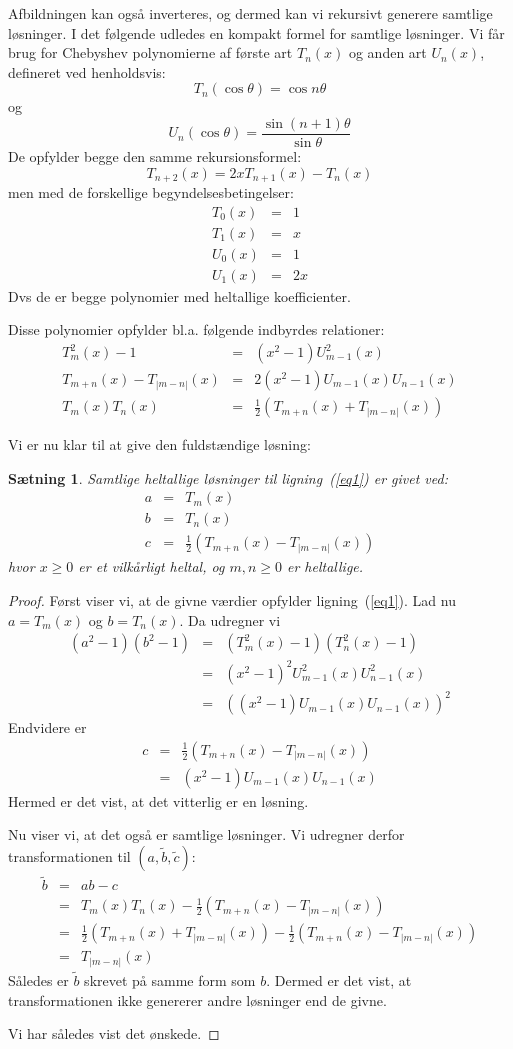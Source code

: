 \documentclass[12pt,oneside,a4paper]{article}
\newcommand{\bas}{\begin{eqnarray*}}
\newcommand{\eas}{\end{eqnarray*}}
\newtheorem{thm}{Sætning}[section]
\begin{document}
Afbildningen kan også inverteres, og dermed kan vi rekursivt generere samtlige
løsninger. I det følgende udledes en kompakt formel for samtlige løsninger. Vi
får brug for Chebyshev polynomierne af første art $T_n(x)$ og anden art
$U_n(x)$, defineret ved henholdsvis:
$$
T_n(\cos\theta) = \cos n\theta
$$
og
$$
U_n(\cos\theta) = \frac{\sin (n+1)\theta}{\sin\theta}
$$
De opfylder begge den samme rekursionsformel:
$$
T_{n+2}(x) = 2xT_{n+1}(x) - T_n(x)
$$
men med de forskellige begyndelsesbetingelser:
\bas
T_0(x) &=& 1 \\
T_1(x) &=& x \\
U_0(x) &=& 1 \\
U_1(x) &=& 2x
\eas
Dvs de er begge polynomier med heltallige koefficienter.

Disse polynomier opfylder bl.a. følgende indbyrdes relationer:
\bas
T_m^2(x) - 1 &=& (x^2-1)U_{m-1}^2(x) \\
T_{m+n}(x) - T_{|m-n|}(x) &=& 2(x^2-1)U_{m-1}(x)U_{n-1}(x) \\
T_m(x) T_n(x) &=& \frac12 \left(T_{m+n}(x) + T_{|m-n|}(x)\right)
\eas

Vi er nu klar til at give den fuldstændige løsning:
\begin{thm}
    Samtlige heltallige løsninger til ligning~(\ref{eq1}) er givet ved:
    \bas
    a &=& T_m(x) \\
    b &=& T_n(x) \\
    c &=& \frac 12 \left(T_{m+n}(x) - T_{|m-n|}(x)\right) 
    \eas
    hvor $x\ge 0$ er et vilkårligt heltal, og $m,n \ge 0$ er heltallige.
\end{thm}
\begin{proof}
    Først viser vi, at de givne værdier opfylder ligning~(\ref{eq1}). 
Lad nu $a=T_m(x)$ og $b = T_n(x)$. Da udregner vi 
\bas
(a^2-1)(b^2-1) &=& (T_m^2(x)-1)(T_n^2(x)-1) \\
                        &=& (x^2-1)^2 U_{m-1}^2(x) U_{n-1}^2(x) \\
                        &=& \left( (x^2-1) U_{m-1}(x) U_{n-1}(x)\right)^2
\eas
Endvidere er 
\bas
c &=& \frac 12 \left(T_{m+n}(x) - T_{|m-n|}(x)\right) \\
&=& (x^2-1) U_{m-1}(x) U_{n-1}(x) 
\eas
Hermed er det vist, at det vitterlig er en løsning.

Nu viser vi, at det også er samtlige løsninger. Vi udregner derfor
transformationen til $(a,\tilde b,\tilde c)$:
\bas
\tilde b &=& a b - c \\
  &=& T_m(x) T_n(x) - \frac 12 \left(T_{m+n}(x) - T_{|m-n|}(x)\right) \\
  &=& \frac12 \left(T_{m+n}(x) + T_{|m-n|}(x)\right) - \frac 12 \left(T_{m+n}(x) - T_{|m-n|}(x)\right) \\
  &=& T_{|m-n|}(x)
\eas
Således er $\tilde b$ skrevet på samme form som $b$. Dermed er det vist, at transformationen ikke genererer andre løsninger end de givne.

Vi har således vist det ønskede.

\end{proof}
\end{document}
